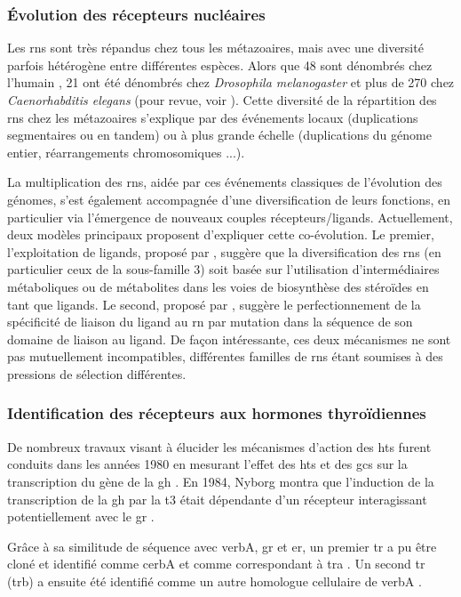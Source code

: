\documentclass[../main.tex]{subfiles}
\begin{document}
		\subsubsection{Évolution des récepteurs nucléaires}
			Les \glspl{rn} sont très répandus chez tous les métazoaires, mais avec une diversité parfois hétérogène entre différentes espèces.
			Alors que 48 sont dénombrés chez l'humain \citep{Robinson-Rechavi2001}, 21 ont été dénombrés chez \textit{Drosophila melanogaster} et plus de 270 chez \textit{Caenorhabditis elegans} (pour revue, voir \citealp{Robinson-Rechavi2003}).
			Cette diversité de la répartition des \glspl{rn} chez les métazoaires s'explique par des événements locaux (duplications segmentaires ou en tandem) ou à plus grande échelle (duplications du génome entier, réarrangements chromosomiques ...).
			\par
			La multiplication des \glspl{rn}, aidée par ces événements classiques de l'évolution des génomes, s'est également accompagnée d'une diversification de leurs fonctions, en particulier via l'émergence de nouveaux couples récepteurs/ligands.
			Actuellement, deux modèles principaux proposent d'expliquer cette co-évolution.
			Le premier, l'exploitation de ligands, proposé par \citet{Thornton2001}, suggère que la diversification des \glspl{rn} (en particulier ceux de la sous-famille 3) soit basée sur l'utilisation d'intermédiaires métaboliques ou de métabolites dans les voies de biosynthèse des stéroïdes en tant que ligands.
			Le second, proposé par \citet{Escriva2006}, suggère le perfectionnement de la spécificité de liaison du ligand au \gls{rn} par mutation dans la séquence de son domaine de liaison au ligand.
			De façon intéressante, ces deux mécanismes ne sont pas mutuellement incompatibles, différentes familles de \glspl{rn} étant soumises à des pressions de sélection différentes.

		\subsubsection{Identification des récepteurs aux hormones thyroïdiennes}
			De nombreux travaux visant à élucider les mécanismes d'action des \glspl{ht} furent conduits dans les années 1980 en mesurant l'effet des \glspl{ht} et des \glspl{gc} sur la transcription du gène de la \gls{gh} .
			En 1984, Nyborg montra que l'induction de la transcription de la \gls{gh} par la \gls{t3} était dépendante d'un récepteur interagissant potentiellement avec le \gls{gr} \citep{Nyborg1984}.
			\par
			Grâce à sa similitude de séquence avec \gls{verbA}, \gls{gr} et \gls{er}, un premier \gls{tr} a pu être cloné et identifié comme \gls{cerbA} et comme correspondant à \gls{tra} \citep{Sap1986,Weinberger1986}.
			Un second \gls{tr} (\gls{trb}) a ensuite été identifié comme un autre homologue cellulaire de \gls{verbA} \citep{Thompson1987}.
\end{document}
